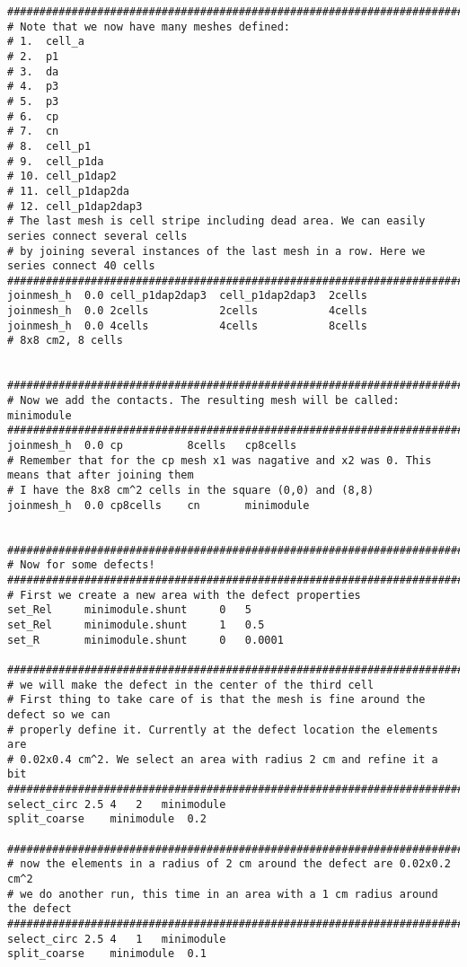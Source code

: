 \documentclass[noshowpacs,preprintnumbers,amsmath,amssymb, letter]{revtex4}
\begin{document}
\begin{small}
\begin{verbatim}
###################################################################################################
# Note that we now have many meshes defined:
# 1.  cell_a
# 2.  p1
# 3.  da
# 4.  p3
# 5.  p3
# 6.  cp
# 7.  cn
# 8.  cell_p1    
# 9.  cell_p1da    
# 10. cell_p1dap2
# 11. cell_p1dap2da    
# 12. cell_p1dap2dap3
# The last mesh is cell stripe including dead area. We can easily series connect several cells 
# by joining several instances of the last mesh in a row. Here we series connect 40 cells
###################################################################################################
joinmesh_h  0.0 cell_p1dap2dap3  cell_p1dap2dap3  2cells    
joinmesh_h  0.0 2cells           2cells           4cells        
joinmesh_h  0.0 4cells           4cells           8cells            
# 8x8 cm2, 8 cells


###################################################################################################
# Now we add the contacts. The resulting mesh will be called: minimodule
###################################################################################################
joinmesh_h  0.0 cp          8cells   cp8cells
# Remember that for the cp mesh x1 was nagative and x2 was 0. This means that after joining them
# I have the 8x8 cm^2 cells in the square (0,0) and (8,8) 
joinmesh_h  0.0 cp8cells    cn       minimodule


###################################################################################################
# Now for some defects!
###################################################################################################
# First we create a new area with the defect properties
set_Rel     minimodule.shunt     0   5
set_Rel     minimodule.shunt     1   0.5
set_R       minimodule.shunt     0   0.0001

###################################################################################################
# we will make the defect in the center of the third cell
# First thing to take care of is that the mesh is fine around the defect so we can 
# properly define it. Currently at the defect location the elements are 
# 0.02x0.4 cm^2. We select an area with radius 2 cm and refine it a bit
###################################################################################################
select_circ 2.5 4   2   minimodule
split_coarse    minimodule  0.2

###################################################################################################
# now the elements in a radius of 2 cm around the defect are 0.02x0.2 cm^2
# we do another run, this time in an area with a 1 cm radius around the defect 
###################################################################################################
select_circ 2.5 4   1   minimodule
split_coarse    minimodule  0.1


\end{verbatim}
\end{small}
\end{document}
